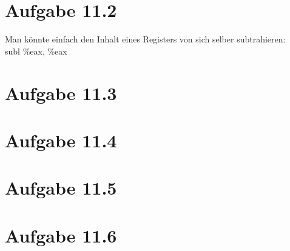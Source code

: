 \documentclass[12pt]{article}
\begin{document}
\section{Aufgabe 11.2}
Man könnte einfach den Inhalt eines Registers von sich selber subtrahieren: \\
subl \%eax, \%eax

\section{Aufgabe 11.3}

\section{Aufgabe 11.4}

\section{Aufgabe 11.5}

\section{Aufgabe 11.6}
\end{document}

